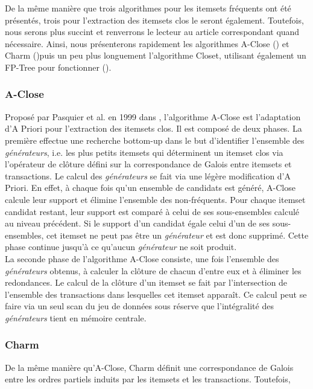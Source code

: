 \documentclass[a4paper,10pt]{report}
\begin{document}
De la même manière que trois algorithmes pour les itemsets fréquents ont été présentés, trois pour l'extraction des itemsets clos le seront également. Toutefois, nous serons plus succint et renverrons le lecteur au article correspondant quand nécessaire. Ainsi, nous présenterons rapidement les algorithmes A-Close (\cite{PAS99}) et Charm (\cite{ZAK99})puis un peu plus longuement l'algorithme Closet, utilisant également un FP-Tree pour fonctionner (\cite{PEI00}). \\

\subsubsection{A-Close}
\hspace{0.15cm}Proposé par Pasquier et al. en 1999 dans \cite{PAS99}, l'algorithme A-Close est l'adaptation d'A Priori  pour l'extraction des itemsets clos. Il est composé de deux phases. La première effectue une recherche bottom-up dans le but d'identifier l'ensemble des \emph{générateurs}, i.e. les plus petits itemsets qui déterminent un itemset clos via l'opérateur de clôture défini sur la correspondance de Galois entre itemsets et transactions. Le calcul des \emph{générateurs} se fait via une légère modification d'A Priori. En effet, à chaque fois qu'un ensemble de candidats est généré, A-Close calcule leur support et élimine l'ensemble des non-fréquents. Pour chaque itemset candidat restant, leur support est comparé à celui de ses sous-ensembles calculé au niveau précédent. Si le support d'un candidat égale celui d'un de ses sous-ensembles, cet itemset ne peut pas être un \emph{générateur} et est donc supprimé. Cette phase continue jusqu'à ce qu'aucun \emph{générateur} ne soit produit. \\

\hspace{0.15cm} La seconde phase de l'algorithme A-Close consiste, une fois l'ensemble des \emph{générateurs} obtenus, à calculer la clôture de chacun d'entre eux et à éliminer les redondances. Le calcul de la clôture d'un itemset se fait par l'intersection de l'ensemble des transactions dans lesquelles cet itemset apparaît. Ce calcul peut se faire via un seul scan du jeu de données sous réserve que l'intégralité des \emph{générateurs} tient en mémoire centrale.

\subsubsection{Charm}
\hspace{0.15cm} De la même manière qu'A-Close, Charm définit une correspondance de Galois entre les ordres partiels induits par les itemsets et les transactions. Toutefois, 

\cite{BOR03} 
\cite{PEI01} 


  
  
\end{document}
